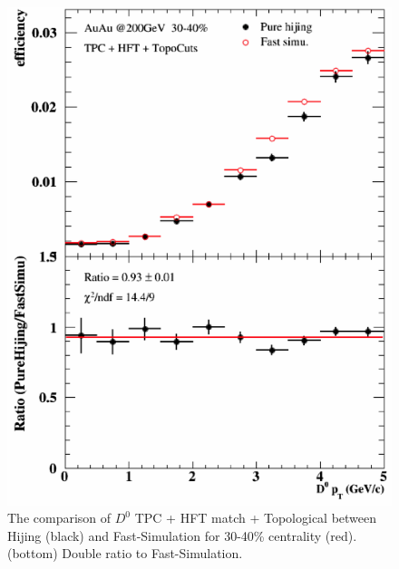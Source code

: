 \documentclass[a4paper]{article}
\begin{document}
\begin{figure}[htbp]
\begin{minipage}[htbp]{0.47\linewidth}
\centering
\includegraphics[width=1.0\textwidth,angle=0]{fig/30_40.png}
\caption{ The comparison of $D^0$ TPC + HFT match + Topological between Hijing (black) and Fast-Simulation for 30-40\% centrality (red). (bottom) Double ratio to Fast-Simulation.\label{30_40}}
\end{minipage}
\hfill
\begin{minipage}[htbp]{0.47\linewidth}
\centering

\end{minipage}
\end{figure}
\end{document}
